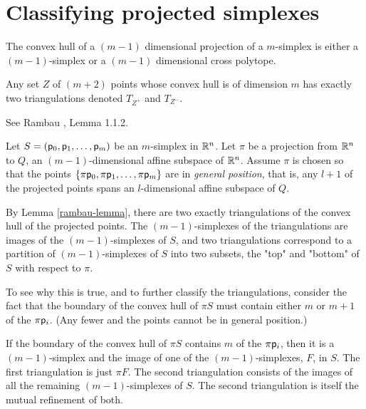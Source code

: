 
\section{Classifying projected simplexes}
\label{sec:classifying}


The convex hull of a $(m-1)$ dimensional projection of a $m$-simplex
is either a $(m-1)$-simplex or a $(m-1)$ dimensional cross polytope.

\begin{Lemma}
\label{rambau-lemma}
Any set $Z$ of $(m+2)$ points whose convex hull is of dimension $m$
has exactly two triangulations denoted $T_{Z^+}$ and $T_{Z^-}$.
\end{Lemma}

See Rambau \cite{rambau-jorg-1996}, Lemma 1.1.2.

Let $S=(\mathsf{p}_0, \mathsf{p}_1, \ldots , \mathsf{p}_m)$ be an $m$-simplex in $\mathbb{R}^{n}$.
Let $\pi$ be a projection from $\mathbb{R}^{n}$ to $Q$, an $(m-1)$-dimensional
affine subspace of $\mathbb{R}^{n}$.
Assume $\pi$ is chosen so that the points
$\{\pi \mathsf{p}_0, \pi \mathsf{p}_1, \ldots , \pi \mathsf{p}_m\}$ are in {\it general position},
that is, any $l+1$ of the projected points spans an $l$-dimensional
affine subspace of $Q$.

By Lemma \ref{rambau-lemma},
there are two exactly triangulations of the convex hull of the projected points.
The $(m-1)$-simplexes of the triangulations are images of the $(m-1)$-simplexes of $S$,
and two triangulations correspond to a partition of $(m-1)$-simplexes of $S$
into two subsets, the "top" and "bottom" of $S$ with respect to $\pi$.

To see why this is true, and to further classify the triangulations,
consider the fact that the boundary of the convex hull of $\pi S$
must contain either $m$ or $m+1$ of the $\pi \mathsf{p}_i$.
(Any fewer and the points cannot be in general position.)

\begin{Theorem}
\label{one-simplex-case}
If the boundary of the convex hull of $\pi S$
contains $m$ of the $\pi \mathsf{p}_i$,
then it is a $(m-1)$-simplex
and the image of one of the $(m-1)$-simplexes, $F$, in $S$.
The first triangulation is just $\pi F$.
The second triangulation consists of the images of
all the remaining $(m-1)$-simplexes of $S$.
The second triangulation is itself the mutual refinement of both.
\end{Theorem}

